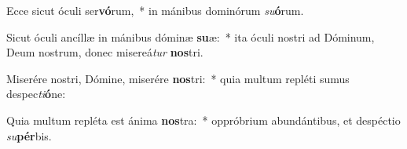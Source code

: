 \item Ecce sicut óculi ser\textbf{vó}rum,~* in mánibus dominórum \textit{su}\textbf{ó}rum.
\item Sicut óculi ancíllæ in mánibus dóminæ \textbf{su}æ:~* ita óculi nostri ad Dóminum, Deum nostrum, donec misereá\textit{tur} \textbf{nos}tri.
\item Miserére nostri, Dómine, miserére \textbf{nos}tri:~* quia multum repléti sumus despec\textit{ti}\textbf{ó}ne:
\item Quia multum repléta est ánima \textbf{nos}tra:~* oppróbrium abundántibus, et despéctio \textit{su}\textbf{pér}bis.
